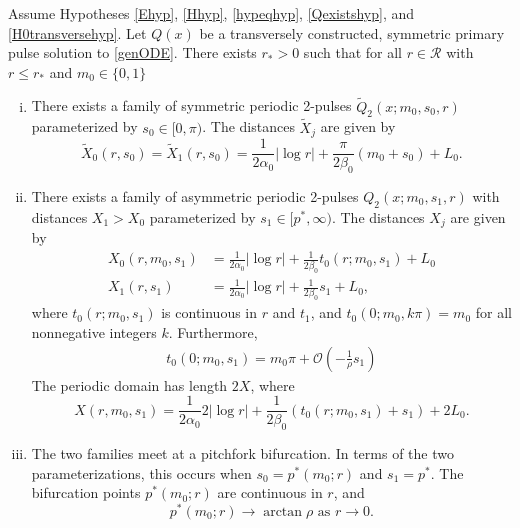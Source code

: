 \documentclass[thesis.tex]{subfiles}
\begin{document}
\begin{theorem}\label{2pulsebifurcation}
Assume Hypotheses \ref{Ehyp}, \ref{Hhyp}, \ref{hypeqhyp}, \ref{Qexistshyp}, and \ref{H0transversehyp}. Let $Q(x)$ be a transversely constructed, symmetric primary pulse solution to \eqref{genODE}. There exists $r_* > 0$ such that for all $r \in \mathcal{R}$ with $r \leq r_*$ and $m_0 \in \{0, 1\}$
\begin{enumerate}[(i)]
	\item There exists a family of symmetric periodic 2-pulses $\tilde{Q}_2(x; m_0, s_0, r)$ parameterized by $s_0 \in [0, \pi)$. The distances $\tilde{X}_j$ are given by
	\begin{equation}\label{2psymmdist}
		\tilde{X}_0(r, s_0) = \tilde{X}_1(r, s_0) = \frac{1}{2 \alpha_0} |\log r| + \frac{\pi}{2\beta_0} (m_0 + s_0) + L_0.
	\end{equation}
	\item There exists a family of asymmetric periodic 2-pulses $Q_2(x; m_0, s_1, r)$ with distances $X_1 > X_0$ parameterized by $s_1 \in [p^*, \infty)$. The distances $X_j$ are given by
	\begin{equation}\label{2pasymmdist}
	\begin{aligned}
		X_0(r, m_0, s_1) &= \frac{1}{2 \alpha_0} |\log r| + \frac{1}{2\beta_0} t_0(r; m_0, s_1) + L_0 \\
		X_1(r, s_1) &= \frac{1}{2 \alpha_0} |\log r| + \frac{1}{2\beta_0} s_1 + L_0, 
	\end{aligned}
	\end{equation}
	where $t_0(r; m_0, s_1)$ is continuous in $r$ and $t_1$, and $t_0(0; m_0, k \pi) = m_0$ for all nonnegative integers $k$. Furthermore,
	\begin{align}\label{deft0}
	t_0(0; m_0, s_1) = m_0 \pi + \mathcal{O}\left(-\frac{1}{\rho} s_1 \right)
	\end{align}
	The periodic domain has length $2X$, where
	\begin{equation}\label{X2pdomain}
	X(r, m_0, s_1) = \frac{1}{2 \alpha_0} 2 |\log r| + \frac{1}{2\beta_0} \left( t_0(r; m_0, s_1) + s_1\right) + 2 L_0.
	\end{equation}

	\item The two families meet at a pitchfork bifurcation. In terms of the two parameterizations, this occurs when $s_0 = p^*(m_0; r)$ and $s_1 = p^*$. The bifurcation points $p^*(m_0; r)$ are continuous in $r$, and
	\[
	p^*(m_0; r) \rightarrow \arctan \rho \text{ as }r \rightarrow 0.
	\]
\end{enumerate}
\end{theorem}
\end{document}
